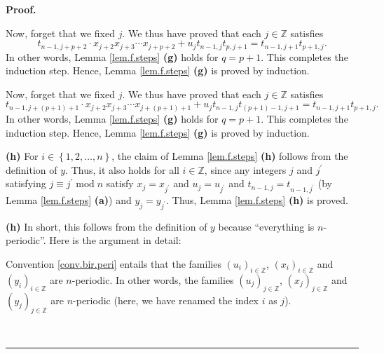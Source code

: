 \documentclass[numbers=enddot,12pt,final,onecolumn,notitlepage]{scrartcl}%
\theoremstyle{definition}
\newenvironment{proof}[1][Proof]{\noindent\textbf{#1.} }{\ \rule{0.5em}{0.5em}}
\newenvironment{verlong}{}{}
\newenvironment{vershort}{}{}
\begin{document}
\begin{proof}
\begin{verlong}
\end{verlong}

\begin{vershort}
Now, forget that we fixed $j$. We thus have proved that each $j\in\mathbb{Z}$
satisfies%
\[
t_{n-1,j+p+2}\cdot x_{j+2}x_{j+3}\cdots x_{j+p+2}+u_{j}t_{n-1,j}%
t_{p,j+1}=t_{n-1,j+1}t_{p+1,j}.
\]
In other words, Lemma \ref{lem.f.steps} \textbf{(g)} holds for $q=p+1$. This
completes the induction step. Hence, Lemma \ref{lem.f.steps} \textbf{(g)} is
proved by induction.
\end{vershort}

\begin{verlong}
Now, forget that we fixed $j$. We thus have proved that each $j\in\mathbb{Z}$
satisfies%
\[
t_{n-1,j+\left(  p+1\right)  +1}\cdot x_{j+2}x_{j+3}\cdots x_{j+\left(
p+1\right)  +1}+u_{j}t_{n-1,j}t_{\left(  p+1\right)  -1,j+1}=t_{n-1,j+1}%
t_{p+1,j}.
\]
In other words, Lemma \ref{lem.f.steps} \textbf{(g)} holds for $q=p+1$. This
completes the induction step. Hence, Lemma \ref{lem.f.steps} \textbf{(g)} is
proved by induction.
\end{verlong}

\begin{vershort}
\textbf{(h)} For $i\in\left\{  1,2,\ldots,n\right\}  $, the claim of Lemma
\ref{lem.f.steps} \textbf{(h)} follows from the definition of $y$. Thus, it
also holds for all $i\in\mathbb{Z}$, since any integers $j$ and $j^{\prime}$
satisfying $j\equiv j^{\prime}\operatorname{mod}n$ satisfy $x_{j}%
=x_{j^{\prime}}$ and $u_{j}=u_{j^{\prime}}$ and $t_{n-1,j}=t_{n-1,j^{\prime}}$
(by Lemma \ref{lem.f.steps} \textbf{(a)}) and $y_{j}=y_{j^{\prime}}$. Thus,
Lemma \ref{lem.f.steps} \textbf{(h)} is proved.
\end{vershort}

\begin{verlong}
\textbf{(h)} In short, this follows from the definition of $y$ because
\textquotedblleft everything is $n$-periodic\textquotedblright. Here is the
argument in detail:

Convention \ref{conv.bir.peri} entails that the families $\left(
u_{i}\right)  _{i\in\mathbb{Z}}$, $\left(  x_{i}\right)  _{i\in\mathbb{Z}}$
and $\left(  y_{i}\right)  _{i\in\mathbb{Z}}$ are $n$-periodic. In other
words, the families $\left(  u_{j}\right)  _{j\in\mathbb{Z}}$, $\left(
x_{j}\right)  _{j\in\mathbb{Z}}$ and $\left(  y_{j}\right)  _{j\in\mathbb{Z}}$
are $n$-periodic (here, we have renamed the index $i$ as $j$).


\end{verlong}
\end{proof}
\end{document}
